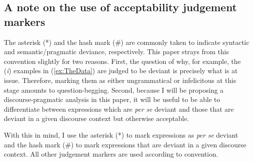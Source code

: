 \documentclass[
	letterpaper,
]{article}
\begin{document}
\subsection{A note on the use of acceptability judgement markers}
The asterisk (*) and the hash mark (\#) are commonly taken to indicate syntactic and semantic/pragmatic deviance, respectively.
This paper strays from this convention slightly for two reasons.
First, the question of why, for example, the (\textit{i}) examples in (\ref{ex:TheData}) are judged to be deviant is precisely what is at issue.
Therefore, marking them as either ungrammatical or infelicitous at this stage amounts to question-begging.
Second, because I will be proposing a discourse-pragmatic analysis in this paper, it will be useful to be able to differentiate between expressions which are \textit{per se} deviant and those that are deviant in a given discourse context but otherwise acceptable.

With this in mind, I use the asterisk (*) to mark expressions as \textit{per se} deviant and the hash mark (\#) to mark expressions that are deviant in a given discourse context. 
All other judgement markers are used according to convention.
\end{document}
